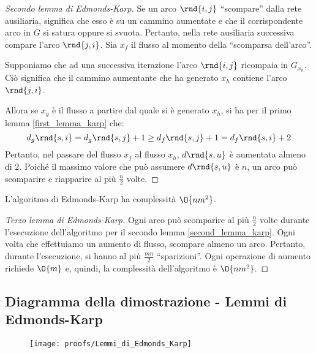 \documentclass[\main/main.tex]{subfiles}
\begin{document}
\begin{proof}[Secondo lemma di Edmonds-Karp]
  Se un arco \(\rnd{i, j}\) ``scompare'' dalla rete ausiliaria, significa che esso è su un cammino aumentate e che il corrispondente arco in \(G\) si satura oppure si svuota. Pertanto, nella rete ausiliaria successiva compare l'arco \(\rnd{j, i}\). Sia \(x_f\) il flusso al momento della ``scomparsa dell'arco''.

  Supponiamo che ad una successiva iterazione l'arco \(\rnd{i, j}\) ricompaia in \(G_{x_h}\). Ciò significa che il cammino aumentante che ha generato \(x_h\) contiene l'arco \(\rnd{j, i}\).

  Allora se \(x_g\) è il flusso a partire dal quale si è generato \(x_h\), si ha per il primo lemma \ref{first_lemma_karp} che:
  \[
    d_g\rnd{s, i} = d_g\rnd{s, j} + 1 \geq d_f\rnd{s, j} + 1 = d_f\rnd{s, i} + 2
  \]
  Pertanto, nel passare del flusso \(x_f\) al flusso \(x_h\), \(d\rnd{s, u}\) è aumentata almeno di \(2\). Poiché il massimo valore che può assumere \(d\rnd{s, u}\) è \(n\), un arco può scomparire e riapparire al più \(\frac{n}{2}\) volte.
\end{proof}

\begin{lemma}
  L'algoritmo di Edmonds-Karp ha complessità \(\O{nm^2}\).
\end{lemma}
\begin{proof}[Terzo lemma di Edmonds-Karp]
  Ogni arco può scomparire al più \(\frac{n}{2}\) volte durante l'esecuzione dell'algoritmo per il secondo lemma \ref{second_lemma_karp}. Ogni volta che effettuiamo un aumento di flusso, scompare almeno un arco. Pertanto, durante l'esecuzione, si hanno al più \(\frac{mn}{2}\) ``sparizioni''. Ogni operazione di aumento richiede \(\O{m}\) e, quindi, la complessità dell'algoritmo è \(\O{nm^2}\).
\end{proof}
\clearpage
\subsection{Diagramma della dimostrazione - Lemmi di Edmonds-Karp}
\begin{figure}
  \texttt{[image: proofs/Lemmi\_di\_Edmonds\_Karp]}
\end{figure}
\end{document}
